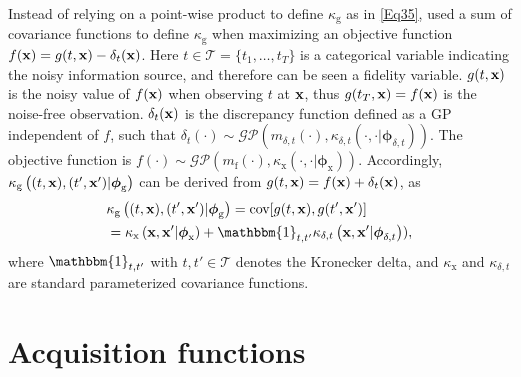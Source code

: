 \documentclass[iicol,sn-basic]{sn-jnl}%
\begin{document}
Instead of relying on a point-wise product to define $\kappa_\text{g}$ as in \cref{Eq35}, \cite{Poloczek2017} used a sum of covariance functions to define $\kappa_\text{g}$ when maximizing an objective function $f({\bf x}) = g(t,{\bf x}) - \delta_t({\bf x})$.
Here $t \in \mathcal{T} = \{t_1,\dots,t_T\}$ is a categorical variable indicating the noisy information source, and therefore can be seen a fidelity variable.
$g(t,{\bf x})$ is the noisy value of $f({\bf x})$ when observing $t$ at ${\bf x}$, thus $g(t_T,{\bf x}) = f({\bf x})$ is the noise-free observation.
$\delta_t({\bf x})$ is the discrepancy function defined as a GP independent of $f$, such that $\delta_t(\cdot) \sim \mathcal{GP}(m_{\delta,t}(\cdot),\kappa_{\delta,t}\left(\cdot,\cdot|{\boldsymbol \phi}_{\delta,t}\right))$.
The objective function is $f(\cdot) \sim \mathcal{GP}(m_\text{f}(\cdot),\kappa_\text{x}\left(\cdot,\cdot|{\boldsymbol \phi}_\text{x}\right))$.
Accordingly, $\kappa_\text{g}\left((t,{\bf x}),(t',{\bf x}')|{\boldsymbol \phi}_\text{g}\right)$ can be derived from $g(t,{\bf x}) = f({\bf x}) + \delta_t({\bf x})$, as
\begin{equation}\label{Eq39a}
	\begin{aligned}
		& \kappa_\text{g}\left((t,{\bf x}),(t',{\bf x}')|{\boldsymbol \phi}_\text{g}\right) = \text{cov}[g(t,{\bf x}),g(t',{\bf x}')]\\
		& =\kappa_\text{x}\left({\bf x},{\bf x}'|{\boldsymbol \phi}_\text{x}\right) +  \mathbbm{1}_{t,t'} \kappa_{\delta,t}\left({\bf x},{\bf x}'|{\boldsymbol \phi}_{\delta,t}\right)),
	\end{aligned}
\end{equation}
where $\mathbbm{1}_{t,t'}$ with $t,t' \in \mathcal{T}$ denotes the Kronecker delta, and $\kappa_\text{x}$ and $\kappa_{\delta,t}$ are standard parameterized covariance functions.

\section{Acquisition functions}\label{Sec5}
\end{document}
